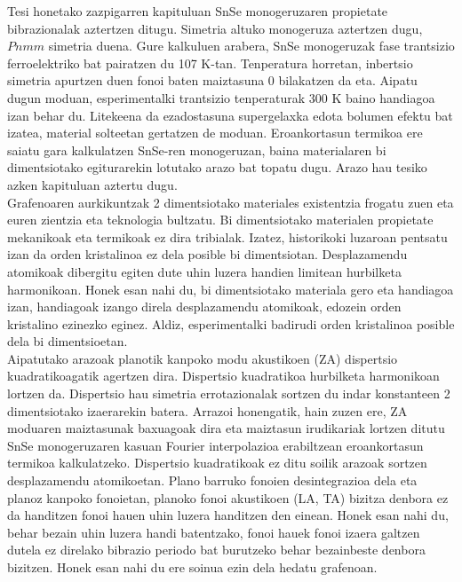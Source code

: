 Tesi honetako zazpigarren kapituluan SnSe monogeruzaren propietate bibrazionalak aztertzen ditugu. Simetria altuko 
monogeruza aztertzen dugu, $Pnmm$ simetria duena. Gure kalkuluen arabera, SnSe monogeruzak fase trantsizio 
ferroelektriko bat pairatzen du 107 K-tan. Tenperatura horretan, inbertsio simetria apurtzen duen fonoi baten 
maiztasuna 0 bilakatzen da eta. Aipatu dugun moduan, esperimentalki trantsizio tenperaturak 300 K baino handiagoa 
izan behar du. Litekeena da ezadostasuna supergelaxka edota bolumen efektu bat izatea, material solteetan gertatzen 
de moduan. Eroankortasun termikoa ere saiatu gara kalkulatzen SnSe-ren monogeruzan, baina materialaren bi 
dimentsiotako egiturarekin lotutako arazo bat topatu dugu. Arazo hau tesiko azken kapituluan aztertu dugu. \\

Grafenoaren aurkikuntzak\cite{novoselov2004electric,novoselov2005two,novoselov2005twoo,zhang2005experimental} 2 
dimentsiotako materiales existentzia frogatu zuen eta euren zientzia eta teknologia bultzatu. Bi dimentsiotako 
materialen propietate mekanikoak eta termikoak ez dira tribialak. Izatez, historikoki luzaroan pentsatu izan da 
orden kristalinoa ez dela posible bi dimentsiotan\cite{landau_statistical_physics,mermin1968crystalline}. 
Desplazamendu atomikoak dibergitu egiten dute uhin luzera handien limitean hurbilketa harmonikoan. Honek esan nahi 
du, bi dimentsiotako materiala gero eta handiagoa izan, handiagoak izango direla desplazamendu atomikoak, edozein 
orden kristalino ezinezko eginez. Aldiz, esperimentalki badirudi orden kristalinoa posible dela bi dimentsioetan. \\

Aipatutako arazoak planotik kanpoko modu akustikoen (ZA) dispertsio kuadratikoagatik agertzen dira. Dispertsio 
kuadratikoa hurbilketa harmonikoan lortzen da. Dispertsio hau simetria errotazionalak sortzen du indar konstanteen 
2 dimentsiotako izaerarekin batera. Arrazoi honengatik, hain zuzen ere, ZA moduaren maiztasunak baxuagoak dira eta 
maiztasun irudikariak lortzen ditutu SnSe monogeruzaren kasuan Fourier interpolazioa erabiltzean eroankortasun 
termikoa kalkulatzeko. Dispertsio kuadratikoak ez ditu soilik arazoak sortzen desplazamendu atomikoetan. Plano 
barruko fonoien desintegrazioa dela eta planoz kanpoko fonoietan, planoko fonoi akustikoen (LA, TA) bizitza denbora 
ez da handitzen fonoi hauen uhin luzera handitzen den einean\cite{bonini2012acoustic}. Honek esan nahi du, behar 
bezain uhin luzera handi batentzako, fonoi hauek fonoi izaera galtzen dutela ez direlako bibrazio periodo bat 
burutzeko behar bezainbeste denbora bizitzen. Honek esan nahi du ere soinua ezin dela hedatu grafenoan. \\

